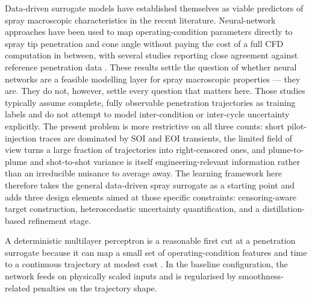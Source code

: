 \documentclass[english, 12pt, a4paper, elec, utf8, a-2b, online]{aaltothesis}
\begin{document}
Data-driven surrogate models have established themselves as viable predictors of spray macroscopic characteristics in the recent literature. 
Neural-network approaches have been used to map operating-condition parameters directly to spray tip penetration and cone angle 
without paying the cost of a full CFD computation in between, with several studies reporting close agreement against reference penetration data \cite{VazKarathanasis2026,liu2020sprayreview}.
These results settle the question of whether neural networks are a feasible modelling layer for spray macroscopic properties 
--- they are. They do not, however, settle every question that matters here. 
Those studies typically assume complete, fully observable penetration trajectories as training labels 
and do not attempt to model inter-condition or inter-cycle uncertainty explicitly. 
The present problem is more restrictive on all three counts: 
short pilot-injection traces are dominated by SOI and EOI transients, 
the limited field of view turns a large fraction of trajectories into right-censored ones, 
and plume-to-plume and shot-to-shot variance is itself engineering-relevant information rather than an irreducible nuisance to average away. 
The learning framework here therefore takes the general data-driven spray surrogate as a starting point 
and adds three design elements aimed at those specific constraints: 
censoring-aware target construction, heteroscedastic uncertainty quantification, and a distillation-based refinement stage.

A deterministic multilayer perceptron is a reasonable first cut at a penetration surrogate 
because it can map a small set of operating-condition features and time to a continuous trajectory at modest cost \cite{BishopPRML2006}. 
In the baseline configuration, the network feeds on physically scaled inputs and is regularised by smoothness-related penalties on the trajectory shape.
\end{document}
